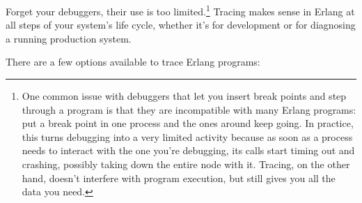 \documentclass[11pt, oneside]{book}   	%
\begin{document}
Forget your debuggers, their use is too limited.\footnote{One common issue with debuggers that let you insert break points and step through a program is that they are incompatible with many Erlang programs: put a break point in one process and the ones around keep going. In practice, this turns debugging into a very limited activity because as soon as a process needs to interact with the one you're debugging, its calls start timing out and crashing, possibly taking down the entire node with it. Tracing, on the other hand, doesn't interfere with program execution, but still gives you all the data you need.} Tracing makes sense in Erlang at all steps of your system's life cycle, whether it's for development or for diagnosing a running production system. 

There are a few options available to trace Erlang programs:
\end{document}
